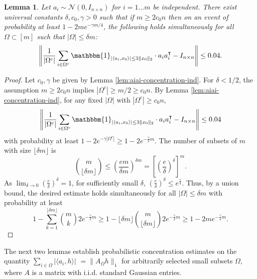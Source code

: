 \documentclass[12pt]{article}
\newcommand{\1}{\mathbbm{1}}
\newcommand{\floor}[1]{\lfloor #1 \rfloor}
\newcommand{\xo}{x_0}
\newcommand{\Omegac}{\Omega^c}
\newcommand{\inddefwithnorm}{\mathbbm{1}_{|\langle a_i, \xo \rangle| \leq 3 \| \xo \|_2}}
\newcommand{\aih}{\langle a_i, h \rangle}
\newtheorem{lemma}[theorem]{Lemma}
\begin{document}
\begin{lemma}\label{lem:isometry-allomega-withind}
 Let $a_i \sim \mathcal{N}(0, I_{n \times n})$ for $i = 1 \ldots m$ be independent.  There exist universal constants $\delta, c_0, \gamma>0$ such that if $m \geq 2 c_0 n$ then on an event of probability at least $1- 2 m e^{-\gamma m/4}$, the following holds simultaneously for all $\Omega \subset [m]$ such that $|\Omega| \leq \delta m$:
\begin{align}
\left \| \frac{1}{|\Omegac|} \sum_{i \in \Omegac} \inddefwithnorm \cdot a_i a_i^\intercal  - I_{n \times n} \right \| \leq 0.04.
\end{align}
\end{lemma}
\begin{proof}
Let $c_0, \gamma$ be given by Lemma \ref{lem:aiai-concentration-ind}.  For $\delta < 1/2$, the assumption $m \geq 2 c_0 n$ implies $|\Omegac| \geq m/2 \geq c_0 n$.  By Lemma \ref{lem:aiai-concentration-ind}, for any fixed $|\Omega|$ with $|\Omegac|  \geq c_0 n$,
$$\left \| \frac{1}{|\Omegac|} \sum_{i \in \Omegac} \inddefwithnorm \cdot a_i a_i^\intercal  - I_{n \times n} \right \| \leq 0.04$$
with probability at least $1 - 2 e^{-\gamma | \Omegac|} \geq 1 - 2 e^{-\frac{\gamma}{2}  m} $.    The number of subsets of $m$ with size $\floor{\delta m}$ is  
$$
{m \choose \floor{\delta m}} \leq \left( \frac{e m}{\delta m} \right ) ^{\delta m} = \left[ \left( \frac{e}{\delta} \right)^\delta \right]^m.
$$
As $\lim_{\delta \to 0} \left( \frac{e}{\delta} \right)^\delta = 1$, for sufficiently small $\delta$, $\left( \frac{e}{\delta} \right)^\delta \leq e^{\frac{\gamma}{4} }$. Thus, by a union bound, the desired estimate holds simultaneously for all $|\Omega| \leq \delta m$ with probability at least
$$
1 - \sum_{k=1}^{\floor{\delta m}} {m \choose k} 2 e^{-\frac{\gamma}{2} m}  \geq 1 - \floor{\delta m} {m \choose \floor{\delta m}}  2 e^{-\frac{\gamma}{2}  m} \geq 1 - 2 m e^{-\frac{\gamma}{4} m}.
$$
\end{proof}


The next two lemmas establish probabilistic concentration estimates on the quantity $\sum_{i \in \Omega} |\aih|$ $=\| A_\Omega h \|_1$ for arbitrarily  selected small subsets $\Omega$, where $A$ is a matrix with i.i.d. standard Gaussian entries. 
\end{document}
